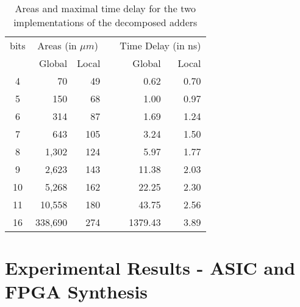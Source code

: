 \documentclass[a4paper]{article}
\begin{document}
\begin{table}[!htb]
\centering
    \caption{Areas and maximal time delay for the two implementations of the decomposed adders}
		\vspace{6pt}
		\begin{tabular}{crrcrr}
\toprule
bits & \multicolumn{2}{c}{Areas (in $\unit{\mu m}$)}	&& \multicolumn{2}{c}{Time Delay (in ns)} \\
\cmidrule{2-3}
\cmidrule{5-6} 
  & Global & Local && Global & Local \\
\midrule 
4	 & 70 & 49 && 0.62 & 0.70 \\ 
5	 & 150 & 68 && 1.00 & 0.97 \\ 
6	 & 314 & 87 && 1.69 & 1.24 \\ 
7	 & 643 & 105 && 3.24 & 1.50 \\ 
8	 & 1,302 & 124 && 5.97 & 1.77 \\ 
9	 & 2,623 & 143 && 11.38 & 2.03 \\ 
10	 & 5,268 & 162 && 22.25 & 2.30 \\ 
11	 & 10,558 & 180 && 43.75 & 2.56 \\ 
16	 & 338,690 & 274 && 1379.43 & 3.89 \\ 
\bottomrule
\end{tabular}
   \label{tab:cla_vs_rca_area_timing}
\end{table}






\section{Experimental Results - ASIC and FPGA Synthesis}

\end{document}
